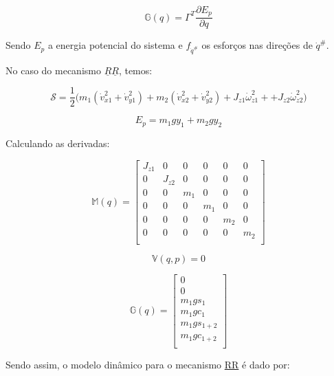 \documentclass[12pt,a4paper]{article}
\begin{document}
\begin{itemize}
\begin{itemize}
	\begin{equation}
	\mathbb{G}(q) =  \Gamma^T \frac{\partial E_p}{\partial q}
	\end{equation}
	
	Sendo $E_p$ a energia potencial do sistema e $f_{\dot{q}^{\#}}$ os esforços nas direções de $\dot{q}^{\#}$.
	
	No caso do mecanismo $\underline{R}\underline{R}$, temos:
	
	\begin{equation}
	\mathcal{S} = \frac{1}{2} \Big( m_1 ( \dot{v}_{x1}^2 + \dot{v}_{y1}^2 ) + m_2 ( \dot{v}_{x2}^2 + \dot{v}_{y2}^2  ) + J_{z1} \dot{\omega}_{z1}^2 + + J_{z2} \dot{\omega}_{z2}^2 \Big)
	\end{equation}
	
	\begin{equation}
	E_p = m_1 g y_1 + m_2 g y_2
	\end{equation}
	
	Calculando as derivadas:
	
	\begin{equation}
	\mathbb{M}(q) =
	\begin{bmatrix}
	J_{z1} & 0 & 0 & 0 & 0 & 0 \\
	0 & J_{z2} & 0 & 0 & 0 & 0 \\
	0 & 0 & m_1 & 0 & 0 & 0 \\
	0 & 0 & 0 & m_1 & 0 & 0 \\
	0 & 0 & 0 & 0 & m_2 & 0 \\
	0 & 0 & 0 & 0 & 0 & m_2 \\
	\end{bmatrix}
	\end{equation}
	
	\begin{equation}
	\mathbb{V}(q,p) = 0
	\end{equation}
	
	\begin{equation}
	\mathbb{G}(q) =
	\begin{bmatrix}
	0 \\
	0 \\
	m_1 g s_1 \\
	m_1 g c_1 \\
	m_1 g s_{1+2} \\
	m_1 g c_{1+2}\\
	\end{bmatrix}
	\end{equation}
	
	Sendo assim, o modelo dinâmico para o mecanismo \underline{R}\underline{R} é dado por:
	

\end{itemize}
\end{itemize}
\end{document}
